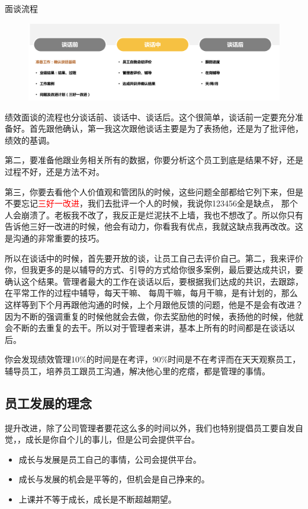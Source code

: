 \documentclass[12pt]{article}
\begin{document}
\begin{framed}
面谈流程

\begin{figure}[H]
    \centering
    \includegraphics[width=1\textwidth]{fig/Ali_Performance_6.png}
\end{figure}

绩效面谈的流程也分谈话前、谈话中、谈话后。这个很简单，谈话前一定要充分准备好。首先跟他确认，第一我这次跟他谈话主要是为了表扬他，还是为了批评他，绩效的基调。

第二，要准备他跟业务相关所有的数据，你要分析这个员工到底是结果不好，还是过程不好，还是方法不对。

第三，你要去看他个人价值观和管团队的时候，这些问题全部都给它列下来，但是不要忘记\textcolor{red}{三好一改进}，我们去批评一个人的时候，我说你123456全是缺点， 那个人会崩溃了。老板我不改了，我反正是烂泥扶不上墙，我也不想改了。所以你只有告诉他三好一改进的时候，他会有动力，你看我有优点，我就这缺点我再改改。这是沟通的非常重要的技巧。

所以在谈话中的时候，首先要开放的谈，让员工自己去评价自己。第二，我来评价你，但我更多的是以辅导的方式、引导的方式给你很多案例，最后要达成共识，要确认这个结果。管理者最大的工作在谈话以后，要根据我们达成的共识，去跟踪，在平常工作的过程中辅导，每天干嘛、 每周干嘛，每月干嘛，是有计划的，那么这样等到下个月再跟他沟通的时候，上个月跟他反馈的问题，他是不是会有改进？因为不断的强调重复的时候他就会去做，你去奖励他的时候，表扬他的时候，他就会不断的去重复的去干。所以对于管理者来讲，基本上所有的时间都是在谈话以后。

你会发现绩效管理10\%的时间是在考评，90\%时间是不在考评而在天天观察员工，辅导员工，培养员工跟员工沟通，解决他心里的疙瘩，都是管理的事情。
\end{framed}

\subsection{员工发展的理念}
提升改进，除了公司管理者要花这么多的时间以外，我们也特别提倡员工要自发自觉，，成长是你自个儿的事儿，但是公司会提供平台。
\begin{itemize}
\setlength{\itemsep}{0pt}
\setlength{\parsep}{0pt}
\setlength{\parskip}{0pt}
    \item 成长与发展是员工自己的事情，公司会提供平台。
    \item 成长与发展的机会是平等的，但机会是自己挣来的。
    \item 上课并不等于成长，成长是不断超越期望。
\end{itemize}
\end{document}
